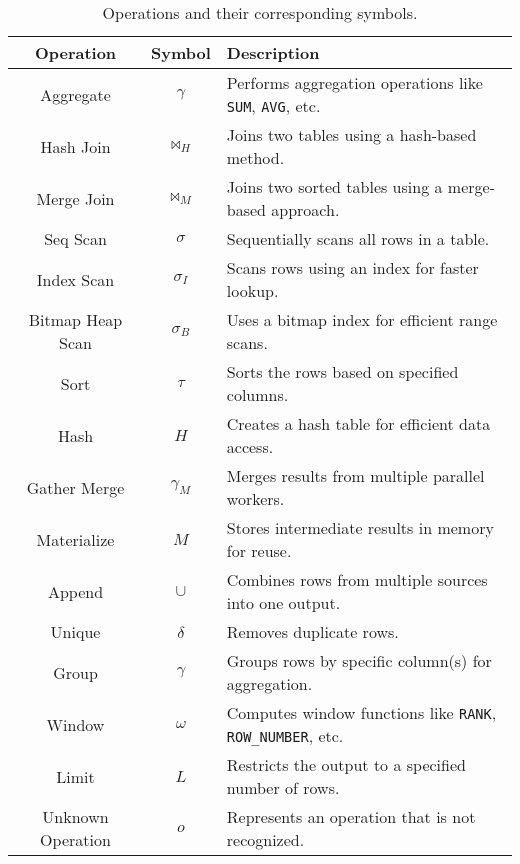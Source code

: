 \begin{table}[ht]
    \centering
    \begin{tabular}{c|c|l}
    \toprule
        \textbf{Operation} & \textbf{Symbol} & \textbf{Description} \\
    \midrule
        Aggregate & $\gamma$ & Performs aggregation operations like \texttt{SUM}, \texttt{AVG}, etc. \\
        Hash Join & $\Join_H$ & Joins two tables using a hash-based method. \\
        Merge Join & $\Join_M$ & Joins two sorted tables using a merge-based approach. \\
        Seq Scan & $\sigma$ & Sequentially scans all rows in a table. \\
        Index Scan & $\sigma_I$ & Scans rows using an index for faster lookup. \\
        Bitmap Heap Scan & $\sigma_B$ & Uses a bitmap index for efficient range scans. \\
        Sort & $\tau$ & Sorts the rows based on specified columns. \\
        Hash & $H$ & Creates a hash table for efficient data access. \\
        Gather Merge & $\gamma_M$ & Merges results from multiple parallel workers. \\
        Materialize & $M$ & Stores intermediate results in memory for reuse. \\
        Append & $\cup$ & Combines rows from multiple sources into one output. \\
        Unique & $\delta$ & Removes duplicate rows. \\
        Group & $\gamma$ & Groups rows by specific column(s) for aggregation. \\
        Window & $\omega$ & Computes window functions like \texttt{RANK}, \texttt{ROW\_NUMBER}, etc. \\
        Limit & $L$ & Restricts the output to a specified number of rows. \\
        Unknown Operation & $o$ & Represents an operation that is not recognized. \\
    \bottomrule
    \end{tabular}
    \caption{Operations and their corresponding symbols.}
    \label{tab:operation_description}
\end{table}



